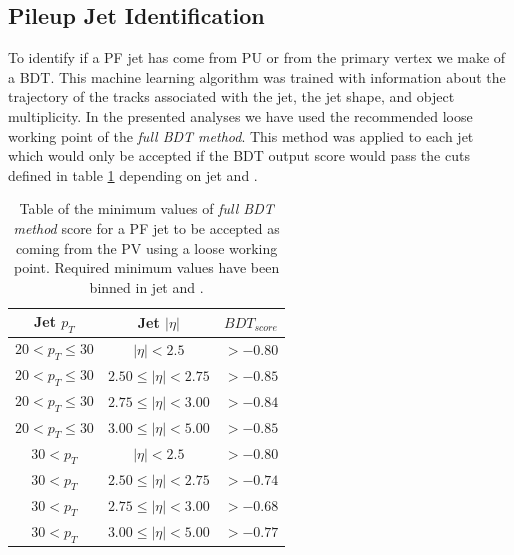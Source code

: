 \subsection{Pileup Jet Identification}
\label{SECTION:EventReconstructionAndSimulation_Jets_PileupJetID}



To identify if a \gls{PF} jet has come from \gls{PU} or from the primary vertex we make of a \gls{BDT}. This machine learning algorithm was trained with information about the trajectory of the tracks associated with the jet, the jet shape, and object multiplicity. In the presented analyses we have used the recommended loose working point of the \textit{full \gls{BDT} method}. This method was applied to each jet which would only be accepted if the \gls{BDT} output score would pass the cuts defined in table \ref{TABLE:EventReconstructionAndSimulation_PileupJetIDFullBDTLooseWorkingPoint} depending on jet \pt and \eta.

\begin{table}[!htb]
\centering
\begin{tabular}{|c|c|c|}
\hline
Jet $p_{T}$          & Jet $|\eta|$              & $BDT_{score}$ \\
\hline \hline
$20 < p_{T} \leq 30$ & $|\eta| < 2.5$            & $> -0.80$ \\
$20 < p_{T} \leq 30$ & $2.50 \leq |\eta| < 2.75$ & $> -0.85$ \\
$20 < p_{T} \leq 30$ & $2.75 \leq |\eta| < 3.00$ & $> -0.84$ \\
$20 < p_{T} \leq 30$ & $3.00 \leq |\eta| < 5.00$ & $> -0.85$ \\
$30 < p_{T}$         & $|\eta| < 2.5$            & $> -0.80$ \\
$30 < p_{T}$         & $2.50 \leq |\eta| < 2.75$ & $> -0.74$ \\
$30 < p_{T}$         & $2.75 \leq |\eta| < 3.00$ & $> -0.68$ \\
$30 < p_{T}$         & $3.00 \leq |\eta| < 5.00$ & $> -0.77$ \\
\hline
\end{tabular}
\caption{Table of the minimum values of \textit{full \gls{BDT} method} score for a \gls{PF} jet to be accepted as coming from the \gls{PV} using a loose working point. Required minimum values have been binned in jet \pt and \eta.}
\label{TABLE:EventReconstructionAndSimulation_PileupJetIDFullBDTLooseWorkingPoint}
\end{table}


